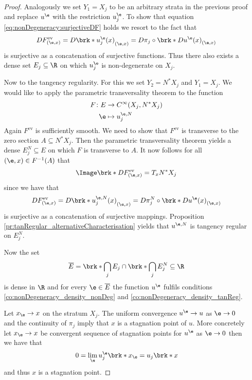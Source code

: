 \begin{proof}
  Analogously we set $Y_1=X_j$ to be an arbitrary strata in the previous proof and replace
  $u^\e$ with the restriction $u_j^\e$. To show that
  equation \eqref{eq:nonDegeneracy:surjectiveDF} holds we resort to the fact that
  \begin{align*}
    DF^\text{ev}_{(\e,x)}
    =D\brk*{u_j^\e(x)}_{(\e,x)}
    =D\pi_j\circ \brk*{Du^\e(x)}_{(\e,x)}
  \end{align*}
  is surjective as a concatenation of surjective functions.
  Thus there also exists a dense set $E_j\subseteq\R$ on which $u^\e_j$ is
  non-degenerate on $X_j$.

  Now to the tangency regularity. 
  For this we set $Y_2=N^*X_j$ and $Y_1=X_j$. 
  We would like to apply the parametric transversality theorem to the function
  \begin{align*}
    F\colon E&\to C^\infty(X_j,N^*X_j) \\
    \e&\mapsto u_j^{\e,N}
  \end{align*}
  Again $F^\text{ev}$ is sufficiently smooth.
  We need to show that $F^\text{ev}$ is transverse to the
  zero section $A\subseteq N^*X_j$. Then the parametric transversality theorem 
  yields a dense $E_j^N\subseteq E$ on which
  $F$ is transverse to $A$.
  It now follows for all $(\e,x)\in F^{-1}(A)$ that
  \begin{align}
    \Image\brk*{DF^\text{ev}_{(\e,x)}}=T_xN^*X_j
  \end{align}
  since we have that
  \begin{align*}
    DF^\text{ev}_{(\e,x)}
    =D\brk*{u_j^{\e,N}(x)}_{(\e,x)}
    =D\pi_j^N\circ \brk*{Du^\e(x)}_{(\e,x)}
  \end{align*}
  is surjective as a concatenation of surjective mappings. 
  Proposition \ref{pr:tanRegular_alternativeCharacterisation}
  yields that $u^{\e,N}$ is tangency regular on $E_j^N$.
  
  Now the set
  \begin{align}
    \overline{E}=\brk*{\bigcap_j E_j}\cap\brk*{\bigcap_j E_j^N}\subseteq\R
  \end{align}
  is dense in $\R$ and
  for every $\e\in\overline{E}$ the function $u^\e$ fulfils conditions
  \ref{co:nonDegeneracy_density_nonDeg} and \ref{co:nonDegeneracy_density_tanReg}.

  
  Let $x_\e\to x$ on the stratum $X_j$.
  The uniform convergence $u^\e\to u$ as $\e\to0$ and the continuity of $\pi_j$ 
  imply that $x$ is a stagnation point of $u$.
  More concretely let $x_\e\to x$ be convergent sequence of stagnation points for $u^\e$
  as $\e\to0$ then we have that
  \begin{align}
    0=\lim_\e u_j^\e\brk*{x_\e}
    =u_j\brk*{x}
  \end{align}
  and thus $x$ is a stagnation point.



\end{proof}
